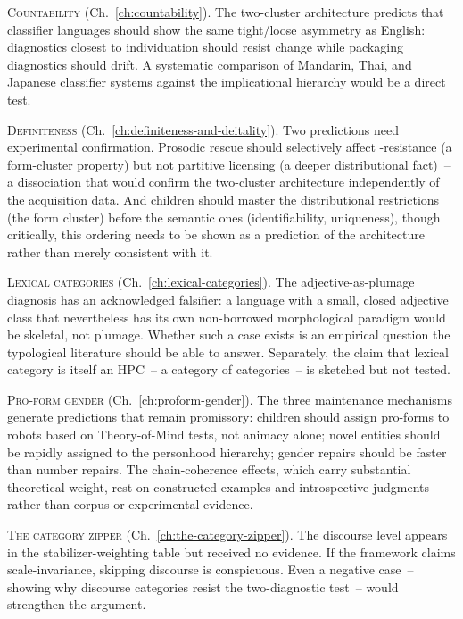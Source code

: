 \textsc{Countability} (Ch.~\ref{ch:countability}). The two-cluster architecture predicts that classifier languages should show the same tight/loose asymmetry as English: diagnostics closest to individuation should resist change while packaging diagnostics should drift. A systematic comparison of Mandarin, Thai, and Japanese classifier systems against the implicational hierarchy would be a direct test.

\textsc{Definiteness} (Ch.~\ref{ch:definiteness-and-deitality}). Two predictions need experimental confirmation. Prosodic rescue should selectively affect -resistance (a form-cluster property) but not partitive licensing (a deeper distributional fact)~-- a dissociation that would confirm the two-cluster architecture independently of the acquisition data. And children should master the distributional restrictions (the form cluster) before the semantic ones (identifiability, uniqueness), though critically, this ordering needs to be shown as a prediction of the architecture rather than merely consistent with it.

\textsc{Lexical categories} (Ch.~\ref{ch:lexical-categories}). The adjective-as-plumage diagnosis has an acknowledged falsifier: a language with a small, closed adjective class that nevertheless has its own non-borrowed morphological paradigm would be skeletal, not plumage. Whether such a case exists is an empirical question the typological literature should be able to answer. Separately, the claim that lexical category is itself an HPC~-- a category of categories~-- is sketched but not tested.

\textsc{Pro-form gender} (Ch.~\ref{ch:proform-gender}). The three maintenance mechanisms generate predictions that remain promissory: children should assign pro-forms to robots based on Theory-of-Mind tests, not animacy alone; novel entities should be rapidly assigned to the personhood hierarchy; gender repairs should be faster than number repairs. The chain-coherence effects, which carry substantial theoretical weight, rest on constructed examples and introspective judgments rather than corpus or experimental evidence.

\textsc{The category zipper} (Ch.~\ref{ch:the-category-zipper}). The discourse level appears in the stabilizer-weighting table but received no evidence. If the framework claims scale-invariance, skipping discourse is conspicuous. Even a negative case~-- showing why discourse categories resist the two-diagnostic test~-- would strengthen the argument.

